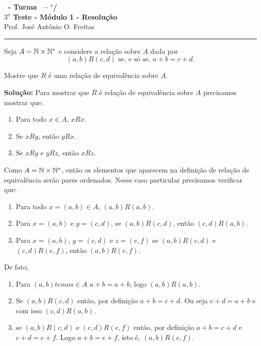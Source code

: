 \documentclass[12pt]{exam}
\begin{document}
\begin{center}
{\Large\bf \disciplina\ - Turma \turma\ -- \semestre$^{o}$/\ano} \\ \vspace{9pt} {\large\bf
$3^{\underline{o}}$ Teste - M\'odulo 1 - Resolu\c{c}\~ao}\\
\vspace{9pt} Prof. Jos{\'e} Ant{\^o}nio O. Freitas
\end{center}
\hrule

\vspace{.6cm}

\questao Seja $A = \mathbb{N} \times \mathbb{N}^*$ e considere a rela\c{c}\~ao sobre $A$ dada por
\[
	(a,b)R(c,d) \mbox{ se, e s\'o se, } a + b = c + d.
\]

Mostre que $R$ \'e uma rela\c{c}\~ao de equival\^encia sobre $A$.

\noindent\textbf{Solu\c{c}\~ao:} Para mostrar que $R$ \'e rela\c{c}\~ao de equival\^encia sobre $A$ precisamos mostrar que:
\begin{enumerate}[label={\roman*})]
	\item Para todo $x \in A$, $xRx$.
	\item Se $xRy$, ent\~ao $yRx$.
	\item Se $xRy$ e $yRz$, ent\~ao $xRz$.
\end{enumerate}

Como $A = \mathbb{N} \times \mathbb{N}^*$, ent\~ao os elementos que aparecem na defini\c{c}\~ao de rela\c{c}\~ao de equival\^encia ser\~ao pares ordenados. Nesse caso particular precisamos verificar que:
\begin{enumerate}[label={\roman*})]
	\item Para todo $x = (a,b) \in A$, $(a,b)R(a,b)$.
	\item Para $x = (a,b)$ e $y = (c,d)$, se $(a,b)R(c,d)$, ent\~ao $(c,d)R(a,b)$.
	\item Para $x = (a,b)$, $y = (c,d)$ e $z = (e,f)$ se $(a,b)R(c,d)$ e $(c,d)R(e,f)$, ent\~ao $(a,b)R(e,f)$.
\end{enumerate}

De fato,
\begin{enumerate}[label={\roman*})]
	\item Para $(a,b) temos \in A$ $a + b = a + b$, logo $(a,b)R(a,b)$.
	\item Se $(a,b)R(c,d)$ ent\~ao, por defini\c{c}\~ao $a + b = c + d$. Ou seja $c + d = a + b$ e com isso $(c,d)R(a,b)$.
	\item se $(a,b)R(c,d)$ e $(c,d)R(e,f)$ ent\~ao, por defini\c{c}\~ao $a + b = c + d$  e $c + d = e + f$. Logo $a + b = e + f$, isto \'e, $(a,b)R(e,f)$.
\end{enumerate}
\end{document}
